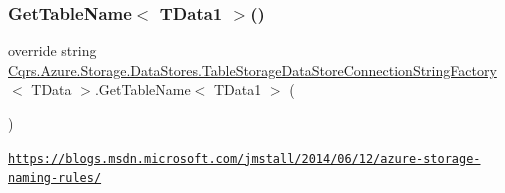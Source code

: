 \subsubsection{\texorpdfstring{Get\+Table\+Name$<$ T\+Data1 $>$()}{GetTableName< TData1 >()}}
{\footnotesize\ttfamily override string \hyperlink{classCqrs_1_1Azure_1_1Storage_1_1DataStores_1_1TableStorageDataStoreConnectionStringFactory}{Cqrs.\+Azure.\+Storage.\+Data\+Stores.\+Table\+Storage\+Data\+Store\+Connection\+String\+Factory}$<$ T\+Data $>$.Get\+Table\+Name$<$ T\+Data1 $>$ (\begin{DoxyParamCaption}{ }\end{DoxyParamCaption})}

\href{https://blogs.msdn.microsoft.com/jmstall/2014/06/12/azure-storage-naming-rules/}{\tt https\+://blogs.\+msdn.\+microsoft.\+com/jmstall/2014/06/12/azure-\/storage-\/naming-\/rules/}
